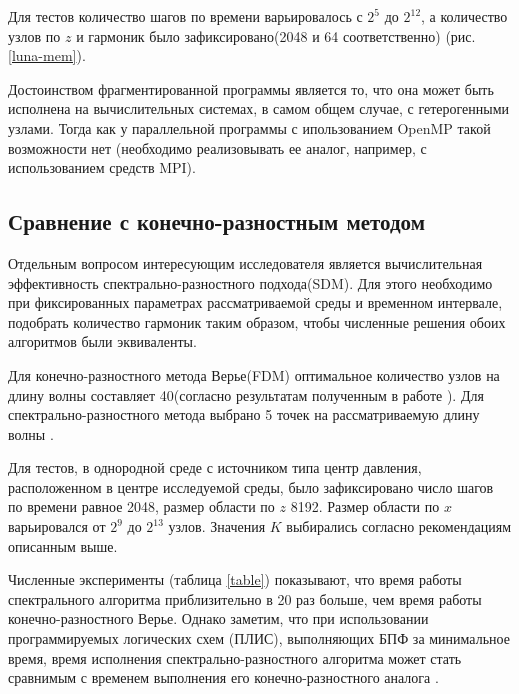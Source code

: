Для тестов количество шагов по времени варьировалось с $2^5$ до $2^{12}$, а количество узлов по $z$
и гармоник было зафиксировано(2048 и 64 соответственно) (рис. \ref{luna-mem}).


Достоинством фрагментированной программы является то, что она может быть исполнена на
вычислительных системах, в самом общем случае, с гетерогенными узлами.
Тогда как у параллельной программы с ипользованием OpenMP такой возможности нет
(необходимо реализовывать ее аналог, например, с использованием средств MPI).

\subsection{Сравнение с конечно-разностным методом}

Отдельным вопросом интересующим исследователя является вычислительная эффективность спектрально-разностного подхода(SDM).
Для этого необходимо при фиксированных параметрах рассматриваемой среды и временном интервале, подобрать количество гармоник таким образом,
чтобы численные решения обоих алгоритмов были эквиваленты.

Для конечно-разностного метода Верье(FDM) оптимальное количество узлов на длину волны составляет 40(согласно результатам полученным в работе \cite{vir}).
Для спектрально-разностного метода выбрано 5 точек на рассматриваемую длину волны \cite{mart}.

Для тестов, в однородной среде с источником типа центр давления, расположенном в центре исследуемой среды,
было зафиксировано число шагов по времени равное 2048, размер области по $z$ 8192.
Размер области по $x$ варьировался от $2^9$ до $2^{13}$ узлов. Значения $K$ выбирались согласно рекомендациям описанным выше.

Численные эксперименты (таблица \ref{table}) показывают, что время работы спектрального алгоритма приблизительно в 20 раз больше,
чем время работы конечно-разностного Верье.
Однако заметим, что при использовании программируемых логических схем (ПЛИС), выполняющих БПФ за минимальное время, время
исполнения спектрально-разностного алгоритма может стать сравнимым с временем выполнения его конечно-разностного аналога \cite{ivan}.

